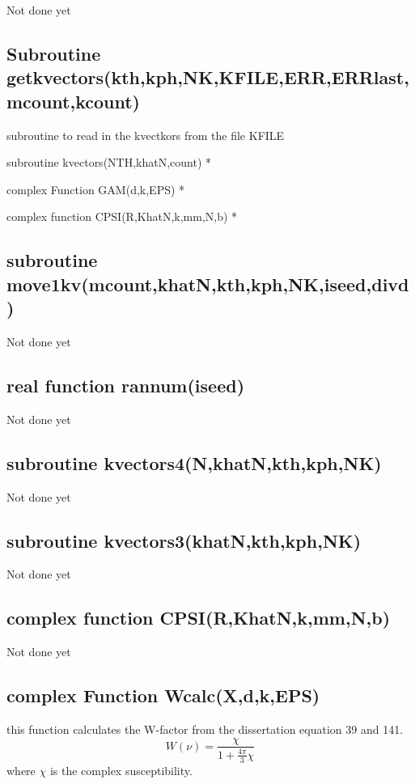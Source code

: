 \documentclass{article}
\begin{document}
Not done yet

\subsection{Subroutine
getkvectors(kth,kph,NK,KFILE,ERR,ERRlast,mcount,kcount)}

subroutine to read in the kvectkors from the file KFILE

subroutine kvectors(NTH,khatN,count) *

complex Function GAM(d,k,EPS) *

complex function CPSI(R,KhatN,k,mm,N,b) *

\subsection{subroutine move1kv(mcount,khatN,kth,kph,NK,iseed,divd) }

Not done yet

\subsection{real function rannum(iseed)}

Not done yet

\subsection{subroutine kvectors4(N,khatN,kth,kph,NK) }

Not done yet

\subsection{subroutine kvectors3(khatN,kth,kph,NK)}

Not done yet

\subsection{complex function CPSI(R,KhatN,k,mm,N,b) }

Not done yet

\subsection{complex Function Wcalc(X,d,k,EPS)}

this function calculates the W-factor from the dissertation equation 39 and
141.%
\[
W\left( \nu \right) =\frac{\chi }{1+\frac{4\pi }{3}\chi }
\]%
where $\chi $ is the complex susceptibility.
\end{document}
